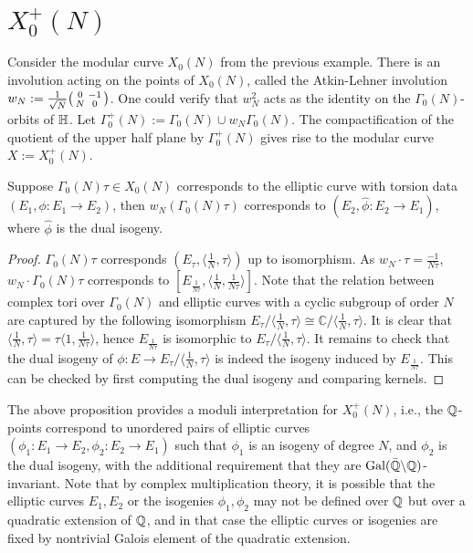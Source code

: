 \section{$X_0^+(N)$}

Consider the modular curve $X_0(N)$ from the previous example. There is an involution acting on the points of $X_0(N)$, called the Atkin-Lehner involution $w_N := \frac{1}{\sqrt{N}} \begin{psmallmatrix} 0 & -1 \\ N & 0 \end{psmallmatrix}$. One could verify that $w_N^2$ acts as the identity on the $\Gamma_0(N)$-orbits of $\mathbb{H}$. Let $\Gamma_0^+(N) := \Gamma_0(N) \cup w_N \Gamma_0(N)$. The compactification of the quotient of the upper half plane by $\Gamma_0^+(N)$ gives rise to the modular curve $X:=X_0^+(N)$.

\begin{proposition}\label{moduli_Nplus}
Suppose $\Gamma_0(N) \tau \in X_0(N)$ corresponds to the elliptic curve with torsion data $(E_1, \phi:E_1\rightarrow E_2)$, then $w_N(\Gamma_0(N) \tau )$  corresponds to $(E_2,\hat{\phi}:E_2\rightarrow E_1)$, where $\hat{\phi}$ is the dual isogeny.
\end{proposition}

\begin{proof}
$\Gamma_0(N)\tau$ corresponds $(E_\tau,\langle\frac{1}{N},\tau \rangle)$ up to isomorphism. As $w_N \cdot \tau = \frac{-1}{N\tau}$, $w_N\cdot \Gamma_0(N)\tau$ corresponds to $[E_{\frac{1}{N\tau}}, \langle\frac{1}{N}, \frac{1}{N\tau} \rangle]$. Note that the relation between complex tori over $\Gamma_0(N)$ and elliptic curves with a cyclic subgroup of order $N$ are captured by the following isomorphism $E_\tau/\langle\frac{1}{N},\tau\rangle \cong \mathbb{C}/\langle\frac{1}{N},\tau\rangle$. It is clear that  $\langle\frac{1}{N},\tau\rangle = \tau \langle 1,\frac{1}{N\tau}\rangle$, hence $E_{\frac{1}{N\tau}}$ is isomorphic to $E_\tau/\langle\frac{1}{N},\tau\rangle$. It remains to check that the dual isogeny of $\phi:E \rightarrow E_\tau/\langle\frac{1}{N},\tau\rangle$ is indeed the isogeny induced by $E_{\frac{1}{N\tau}}$. This can be checked by first computing the dual isogeny and comparing kernels.
\end{proof}

The above proposition provides a moduli interpretation for $X_0^+(N)$, i.e., the $\mathbb{Q}$-points correspond to unordered pairs of elliptic curves $(\phi_1: E_1 \rightarrow E_2, \phi_2: E_2 \rightarrow E_1)$ such that $\phi_1$ is an isogeny of degree $N$, and $\phi_2$ is the dual isogeny, with the additional requirement that they are $\operatorname{Gal}(\bar{\mathbb{Q}}\backslash \mathbb{Q})$-invariant. Note that by complex multiplication theory, it is possible that the elliptic curves $E_1,E_2$ or the isogenies $\phi_1,\phi_2$ may not be defined over $\mathbb{Q}$ but over a quadratic extension of $\mathbb{Q}$, and in that case the elliptic curves or isogenies are fixed by nontrivial Galois element of the quadratic extension.

